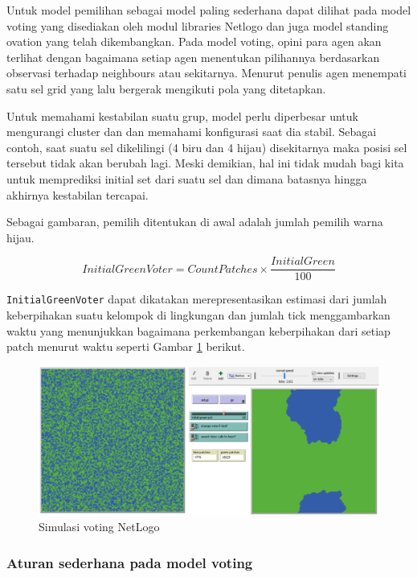 Untuk model pemilihan sebagai model paling sederhana dapat dilihat pada model voting yang disediakan oleh modul libraries Netlogo dan juga model standing ovation yang telah dikembangkan. Pada model voting, opini para agen akan terlihat dengan bagaimana setiap agen menentukan pilihannya berdasarkan observasi terhadap neighbours atau sekitarnya. Menurut penulis \cite{viridi2019agent} agen menempati satu sel grid yang lalu bergerak mengikuti pola yang ditetapkan.

Untuk memahami kestabilan suatu grup, model perlu diperbesar untuk mengurangi cluster dan  dan memahami konfigurasi saat dia stabil. Sebagai contoh, saat suatu sel dikelilingi (4 biru dan 4 hijau) disekitarnya maka posisi sel tersebut tidak akan berubah lagi. Meski demikian, hal ini tidak mudah bagi kita untuk memprediksi initial set dari suatu sel dan dimana batasnya hingga akhirnya kestabilan tercapai.

Sebagai gambaran, pemilih ditentukan di awal adalah jumlah pemilih warna hijau.

\begin{equation}
	InitialGreenVoter = CountPatches \times \frac{InitialGreen}{100}
\end{equation}

\texttt{InitialGreenVoter} dapat dikatakan merepresentasikan estimasi dari jumlah keberpihakan suatu kelompok di lingkungan dan jumlah tick menggambarkan waktu yang menunjukkan bagaimana perkembangan keberpihakan dari setiap patch menurut waktu seperti Gambar \ref{fig:initvoter} berikut.

\begin{figure}[H]
	\centering
	\includegraphics[width=\linewidth]{images/ch02/InitVoter}
	\caption{Simulasi voting NetLogo}
	\label{fig:initvoter}
\end{figure}

\subsubsection{Aturan sederhana pada model voting}


